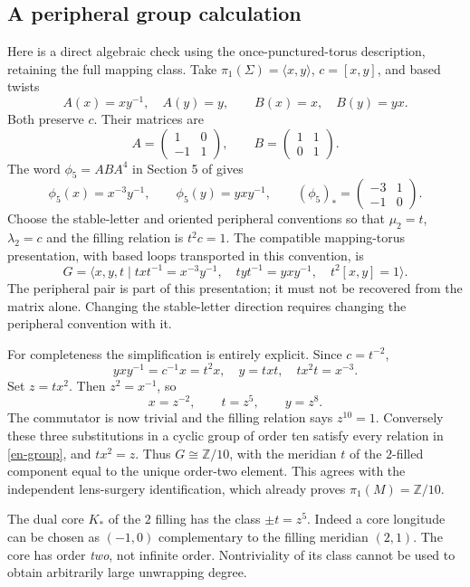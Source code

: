 \documentclass[12pt]{amsart}
\theoremstyle{definition}
\theoremstyle{remark}
\numberwithin{equation}{section}
\newcommand{\Z}{\mathbb{Z}}
\theoremstyle{definition}
\begin{document}
\subsection{A peripheral group calculation}
Here is a direct algebraic check using the once-punctured-torus description, retaining the full mapping class. Take $\pi_1(\Sigma)=\langle x,y\rangle$, $c=[x,y]$, and based twists
\[
A(x)=xy^{-1},\quad A(y)=y,\qquad B(x)=x,\quad B(y)=yx.
\]
Both preserve $c$. Their matrices are
\[
A=\begin{pmatrix}1&0\\-1&1\end{pmatrix},\qquad
B=\begin{pmatrix}1&1\\0&1\end{pmatrix}.
\]
The word $\phi_5=ABA^4$ in Section 5 of \cite{en-MN} gives
\[
\phi_5(x)=x^{-3}y^{-1},\qquad \phi_5(y)=yxy^{-1},\qquad
(\phi_5)_*=\begin{pmatrix}-3&1\\-1&0\end{pmatrix}.
\]
Choose the stable-letter and oriented peripheral conventions so that $\mu_2=t$, $\lambda_2=c$ and the filling relation is $t^2c=1$. The compatible mapping-torus presentation, with based loops transported in this convention, is
\begin{equation}\label{en-group}
G=\langle x,y,t\mid txt^{-1}=x^{-3}y^{-1},\quad
tyt^{-1}=yxy^{-1},\quad t^2[x,y]=1\rangle.
\end{equation}
The peripheral pair is part of this presentation; it must not be recovered from the matrix alone. Changing the stable-letter direction requires changing the peripheral convention with it.

For completeness the simplification is entirely explicit. Since $c=t^{-2}$,
\[
yxy^{-1}=c^{-1}x=t^2x,\quad y=txt,\quad tx^2t=x^{-3}.
\]
Set $z=tx^2$. Then $z^2=x^{-1}$, so
\begin{equation}\label{en-tietze}
x=z^{-2},\qquad t=z^5,\qquad y=z^8.
\end{equation}
The commutator is now trivial and the filling relation says $z^{10}=1$. Conversely these three substitutions in a cyclic group of order ten satisfy every relation in \eqref{en-group}, and $tx^2=z$. Thus $G\cong\Z/10$, with the meridian $t$ of the $2$-filled component equal to the unique order-two element. This agrees with the independent lens-surgery identification, which already proves $\pi_1(M)=\Z/10$.

The dual core $K_*$ of the $2$ filling has the class $\pm t=z^5$. Indeed a core longitude can be chosen as $(-1,0)$ complementary to the filling meridian $(2,1)$. The core has order \emph{two}, not infinite order. Nontriviality of its class cannot be used to obtain arbitrarily large unwrapping degree.
\end{document}
